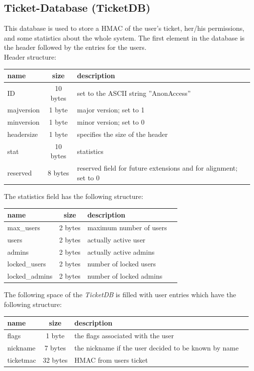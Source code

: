 
\subsection{Ticket-Database (TicketDB)}
This database is used to store a HMAC of the user's ticket, her/his permissions, and some statistics about the whole system.
The first element in the database is the header followed by the entries for the users.\\
Header structure:\\
\begin{tabular}{|l|c|p{3.8cm}|}\hline 
name & size & description \\ \hline
ID & 10 bytes & set to the ASCII string ''AnonAccess'' \\
majversion & 1 byte & major version; set to 1 \\
minversion & 1 byte & minor version; set to 0 \\
headersize & 1 byte & specifies the size of the header \\
stat & 10 bytes & statistics \\
reserved & 8 bytes & reserved field for future extensions and for alignment; set to 0 \\ \hline
\end{tabular} 

The statistics field has the following structure:\\
\begin{tabular}{|l|c|p{3.8cm}|l|} \hline
name & size & description \\ \hline 
max\_users     & 2 bytes & maximum number of users \\
users          & 2 bytes & actually active user \\
admins         & 2 bytes & actually active admins \\
locked\_users  & 2 bytes & number of locked users \\
locked\_admins & 2 bytes & number of locked admins \\ \hline
\end{tabular} 

The following space of the \textit{TicketDB} is filled with user entries which have the following structure:\\
\begin{tabular}{|l|c|p{3.8cm}|l|} \hline
name & size & description \\ \hline 
flags      &  1 byte  & the flags associated with the user \\
nickname   &  7 bytes & the nickname if the user decided to be known by name \\
ticketmac  & 32 bytes & HMAC from users ticket \\ \hline
\end{tabular} 

